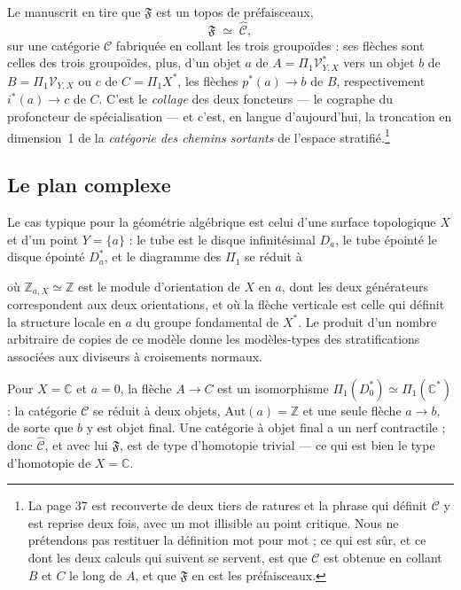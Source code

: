 \documentclass[11pt,a4paper]{article}
\begin{document}
Le manuscrit en tire que $\mathfrak{F}$ est un topos de préfaisceaux,
\[
  \mathfrak{F} \;\simeq\; \widehat{\mathcal{C}},
\]
sur une catégorie $\mathcal{C}$ fabriquée en collant les trois groupoïdes : ses
flèches sont celles des trois groupoïdes, plus, d'un objet $a$ de
$A = \Pi_{1}\mathcal{V}^{*}_{Y,X}$ vers un objet $b$ de
$B = \Pi_{1}\mathcal{V}_{Y,X}$ ou $c$ de $C = \Pi_{1}X^{*}$, les flèches
$p^{*}(a) \to b$ de $B$, respectivement $i^{*}(a) \to c$ de $C$. C'est le
\emph{collage} des deux foncteurs — le cographe du profoncteur de spécialisation
— et c'est, en langue d'aujourd'hui, la troncation en dimension~1 de la
\emph{catégorie des chemins sortants} de l'espace
stratifié.\footnote{La page 37 est recouverte de deux tiers de ratures et la
phrase qui définit $\mathcal{C}$ y est reprise deux fois, avec un mot illisible
au point critique. Nous ne prétendons pas restituer la définition mot pour mot ;
ce qui est sûr, et ce dont les deux calculs qui suivent se servent, est que
$\mathcal{C}$ est obtenue en collant $B$ et $C$ le long de $A$, et que
$\mathfrak{F}$ en est les préfaisceaux.}

\subsection*{Le plan complexe}

Le cas typique pour la géométrie algébrique est celui d'une surface topologique
$X$ et d'un point $Y = \{a\}$ : le tube est le disque infinitésimal $D_{a}$, le
tube épointé le disque épointé $D^{*}_{a}$, et le diagramme des $\Pi_{1}$ se
réduit à


où $\mathbb{Z}_{a,X} \simeq \mathbb{Z}$ est le module d'orientation de $X$ en
$a$, dont les deux générateurs correspondent aux deux orientations, et où la
flèche verticale est celle qui définit la structure locale en $a$ du groupe
fondamental de $X^{*}$. Le produit d'un nombre arbitraire de copies de ce modèle
donne les modèles-types des stratifications associées aux diviseurs à croisements
normaux.

Pour $X = \mathbb{C}$ et $a = 0$, la flèche $A \to C$ est un isomorphisme
$\Pi_{1}(D^{*}_{0}) \simeq \Pi_{1}(\mathbb{C}^{*})$ : la catégorie
$\mathcal{C}$ se réduit à deux objets, $\mathrm{Aut}(a) = \mathbb{Z}$ et une
seule flèche $a \to b$, de sorte que $b$ y est objet final. Une catégorie à
objet final a un nerf contractile ; donc $\widehat{\mathcal{C}}$, et avec lui
$\mathfrak{F}$, est de type d'homotopie trivial — ce qui est bien le type
d'homotopie de $X = \mathbb{C}$.
\end{document}
